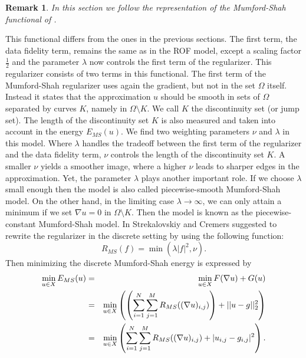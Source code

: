 \documentclass[abstracton]{scrreprt}
\newtheorem{remark}[theorem]{Remark}
\begin{document}
        \begin{remark}
            In this section we follow the representation of the Mumford-Shah functional of \cite{Strekalovskiy-Cremers-eccv14}.
        \end{remark}
        This functional differs from the ones in the previous sections. The first term, the data fidelity term, remains the same as in the ROF model, except a scaling factor $\frac{1}{2}$ and the parameter $\lambda$ now controls the first term of the regularizer. This regularizer consists of two terms in this functional. The first term of the Mumford-Shah regularizer uses again the gradient, but not in the set $\Omega$ itself. Instead it states that the approximation $u$ should be smooth in sets of $\Omega$ separated by curves $K$, namely in $\Omega \setminus K$. We call $K$ the discontinuity set (or jump set). The length of the discontinuity set $K$ is also measured and taken into account in the energy $E_{MS}(u)$. We find two weighting parameters $\nu$ and $\lambda$ in this model. Where $\lambda$ handles the tradeoff between the first term of the regularizer and the data fidelity term, $\nu$ controls the length of the discontinuity set $K$. A smaller $\nu$ yields a smoother image, where a higher $\nu$ leads to sharper edges in the approximation. Yet, the parameter $\lambda$ plays another important role. If we choose $\lambda$ small enough then the model is also called piecewise-smooth Mumford-Shah model. On the other hand, in the limiting case $\lambda \to \infty$, we can only attain a minimum if we set $\nabla u = 0$ in $\Omega \setminus K$. Then the model is known as the piecewise-constant Mumford-Shah model. In \cite{Strekalovskiy-Cremers-eccv14} Strekalovskiy and Cremers suggested to rewrite the regularizer in the discrete setting by using the following function:
            \begin{equation}
                R_{MS}(f) = \min(\lambda |f|^{2},\nu).
            \label{eq:ms_regularizer}
            \end{equation}
        Then minimizing the discrete Mumford-Shah energy is expressed by
            \begin{eqnarray}
                \min_{u \in X} E_{MS}(u) &=& \min_{u \in X} F(\nabla u) + G(u) \notag \\
                &=& \min_{u \in X} \left( \left(\sum_{i = 1}^{N} \sum_{j = 1}^{M} R_{MS}((\nabla u)_{i,j}) \right) + ||u - g||_{2}^{2} \right) \notag \\
                &=& \min_{u \in X} \left(\sum_{i = 1}^{N} \sum_{j = 1}^{M} R_{MS}((\nabla u)_{i,j}) + |u_{i,j} - g_{i,j}|^{2} \right).
            \end{eqnarray}
\end{document}
